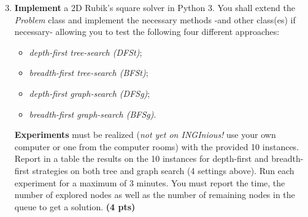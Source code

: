 \documentclass[11pt,a4paper]{report}
\begin{document}
\begin{answers}[4cm]
\end{answers}



\begin{enumerate}
\setcounter{enumi}{2}
    \item \textbf{Implement} a 2D Rubik's square solver in Python 3.
    You shall extend the \emph{Problem} class and implement the necessary methods -and other class(es) if necessary- allowing you to test the following four different approaches: 
    \begin{itemize}
    	\item \textit{depth-first tree-search (DFSt)};
    	\item \textit{breadth-first tree-search (BFSt)};
    	\item \textit{depth-first graph-search (DFSg)};
    	\item \textit{breadth-first graph-search (BFSg)}. 
    \end{itemize}
    \textbf{Experiments} must be realized (\textit{not yet on INGInious!} use your own computer or one from the computer rooms) with the provided 10 instances. 
    Report in a table the results on the 10 instances for depth-first and breadth-first strategies on both tree and graph search (4 settings above). 
    Run each experiment for a maximum of 3 minutes. 
    You must report the time, the number of explored nodes as well as the number of remaining nodes in the queue to get a solution. \textbf{(4 pts)}
\end{enumerate}
\end{document}
